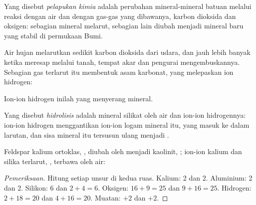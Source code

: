 \begin{definition}\label{def:g10:soil-formation:chemical-weathering}
Yang disebut \emph{pelapukan kimia} adalah perubahan
mineral-mineral batuan melalui reaksi dengan air dan dengan gas-gas yang
dibawanya, karbon dioksida dan oksigen: sebagian mineral melarut, sebagian
lain diubah menjadi mineral baru yang stabil di permukaan Bumi.
\end{definition}

Air hujan melarutkan sedikit karbon dioksida dari udara, dan jauh lebih banyak
ketika meresap melalui tanah, tempat akar dan pengurai mengembuskannya.
Sebagian gas terlarut itu membentuk asam karbonat, yang melepaskan ion
hidrogen:
\begin{center}
\end{center}
Ion-ion hidrogen inilah yang menyerang mineral.

\begin{definition}[Hidrolisis]\label{def:g10:soil-formation:hydrolysis}
Yang disebut \emph{hidrolisis} adalah 
mineral silikat oleh air dan ion-ion hidrogennya: ion-ion hidrogen menggantikan
ion-ion logam mineral itu, yang masuk ke dalam larutan, dan sisa mineral itu
tersusun ulang menjadi .
\end{definition}

\begin{proposition}\label{prop:g10:soil-formation:hydrolysis}
Feldspar kalium ortoklas, , diubah oleh  menjadi
 kaolinit, ; ion-ion kalium dan silika
terlarut, , terbawa oleh air:
\begin{center}
\end{center}
\end{proposition}

\begin{proof}[Pemeriksaan]
Hitung setiap unsur di kedua ruas. Kalium: 2 dan 2. Aluminium: 2 dan 2.
Silikon: 6 dan $2 + 4 = 6$. Oksigen: $16 + 9 = 25$ dan $9 + 16 = 25$.
Hidrogen: $2 + 18 = 20$ dan $4 + 16 = 20$. Muatan: $+2$ dan $+2$.
\end{proof}

